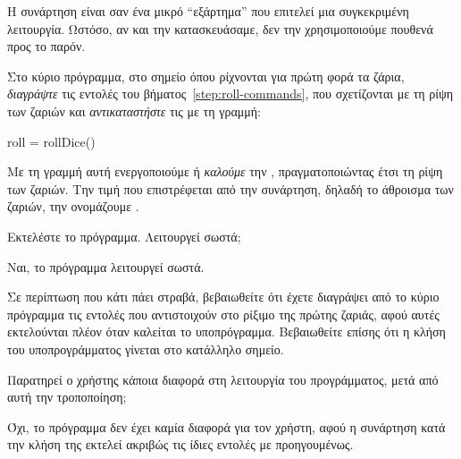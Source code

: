 \documentclass[a4paper,11pt,oneside]{book}
\begin{document}
\begin{step}
Η συνάρτηση  είναι σαν ένα μικρό ``εξάρτημα'' που επιτελεί μια συγκεκριμένη λειτουργία. Ωστόσο, αν και την κατασκευάσαμε, δεν την χρησιμοποιούμε πουθενά προς το παρόν.

Στο κύριο πρόγραμμα, στο σημείο όπου ρίχνονται για πρώτη φορά τα ζάρια, \emph{διαγράψτε} τις εντολές του βήματος~\ref{step:roll-commands}, που σχετίζονται με τη ρίψη των ζαριών και \emph{αντικαταστήστε} τις με τη γραμμή:

\begin{pynew}
roll = rollDice()
\end{pynew}

Με τη γραμμή αυτή ενεργοποιούμε ή \emph{καλούμε} την , πραγματοποιώντας έτσι τη ρίψη των ζαριών. Την τιμή που επιστρέφεται από την συνάρτηση, δηλαδή το άθροισμα των ζαριών, την ονομάζουμε .

Εκτελέστε το πρόγραμμα. Λειτουργεί σωστά;

\begin{answer}
Ναι, το πρόγραμμα λειτουργεί σωστά.
\end{answer}

\marginnote[8pt]{\iconcaution}
Σε περίπτωση που κάτι πάει στραβά, βεβαιωθείτε ότι έχετε διαγράψει από το κύριο πρόγραμμα τις εντολές που αντιστοιχούν στο ρίξιμο της πρώτης ζαριάς, αφού αυτές εκτελούνται πλέον όταν καλείται το υποπρόγραμμα. Βεβαιωθείτε επίσης ότι η κλήση του υποπρογράμματος γίνεται στο κατάλληλο σημείο.

Παρατηρεί ο χρήστης κάποια διαφορά στη λειτουργία του προγράμματος, μετά από αυτή την τροποποίηση;

\begin{answer}
Όχι, το πρόγραμμα δεν έχει καμία διαφορά για τον χρήστη, αφού η συνάρτηση κατά την κλήση της εκτελεί ακριβώς τις ίδιες εντολές με προηγουμένως. 
\end{answer}
\end{step}
\end{document}
